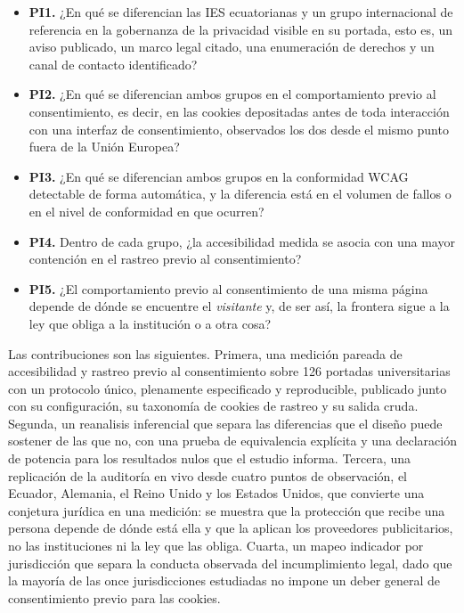 \documentclass[pdflatex,sn-basic,Numbered]{sn-jnl}
\theoremstyle{thmstyleone}
\theoremstyle{thmstyletwo}
\theoremstyle{thmstylethree}
\begin{document}
\begin{itemize}
	\item \textbf{PI1.} ¿En qu\'e se diferencian las IES ecuatorianas y un grupo internacional de referencia en la gobernanza de la privacidad visible en su portada, esto es, un aviso publicado, un marco legal citado, una enumeraci\'on de derechos y un canal de contacto identificado?
	\item \textbf{PI2.} ¿En qu\'e se diferencian ambos grupos en el comportamiento previo al consentimiento, es decir, en las cookies depositadas antes de toda interacci\'on con una interfaz de consentimiento, observados los dos desde el mismo punto fuera de la Uni\'on Europea?
	\item \textbf{PI3.} ¿En qu\'e se diferencian ambos grupos en la conformidad WCAG detectable de forma autom\'atica, y la diferencia est\'a en el volumen de fallos o en el nivel de conformidad en que ocurren?
	\item \textbf{PI4.} Dentro de cada grupo, ¿la accesibilidad medida se asocia con una mayor contenci\'on en el rastreo previo al consentimiento?
	\item \textbf{PI5.} ¿El comportamiento previo al consentimiento de una misma p\'agina depende de d\'onde se encuentre el \emph{visitante} y, de ser as\'i, la frontera sigue a la ley que obliga a la instituci\'on o a otra cosa?
\end{itemize}

Las contribuciones son las siguientes. Primera, una medici\'on pareada de accesibilidad y rastreo previo al consentimiento sobre 126 portadas universitarias con un protocolo \'unico, plenamente especificado y reproducible, publicado junto con su configuraci\'on, su taxonom\'ia de cookies de rastreo y su salida cruda. Segunda, un reanalisis inferencial que separa las diferencias que el dise\~no puede sostener de las que no, con una prueba de equivalencia expl\'icita y una declaraci\'on de potencia para los resultados nulos que el estudio informa. Tercera, una replicaci\'on de la auditor\'ia en vivo desde cuatro puntos de observaci\'on, el Ecuador, Alemania, el Reino Unido y los Estados Unidos, que convierte una conjetura jur\'idica en una medici\'on: se muestra que la protecci\'on que recibe una persona depende de d\'onde est\'a ella y que la aplican los proveedores publicitarios, no las instituciones ni la ley que las obliga. Cuarta, un mapeo indicador por jurisdicci\'on que separa la conducta observada del incumplimiento legal, dado que la mayor\'ia de las once jurisdicciones estudiadas no impone un deber general de consentimiento previo para las cookies.
\end{document}
